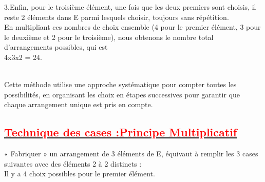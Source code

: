 \documentclass[12pt]{article}
\begin{document}
    3.Enfin, pour le troisième élément, une fois que les deux premiers sont choisis, il reste 2 éléments dans E  parmi lesquels choisir, toujours sans répétition.\\

En multipliant ces nombres de choix ensemble (4 pour le premier élément, 3 pour le deuxième et 2 pour le troisième), nous obtenons le nombre total d'arrangements possibles, qui est\\ 4x3x2 = 24.\\
\\
Cette méthode utilise une approche systématique pour compter toutes les possibilités, en organisant les choix en étapes successives pour garantir que chaque arrangement unique est pris en compte.
\subsection*{\underline{\textbf{\textcolor{red}{Technique des cases :Principe Multiplicatif}}}}
« Fabriquer » un arrangement de 3 éléments de E, équivaut à remplir les 3 cases suivantes avec des éléments 2 à 2 distincts :\\
Il y a 4 choix possibles pour le premier élément.\\
\end{document}

